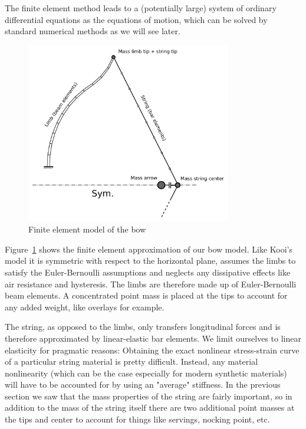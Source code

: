 The finite element method leads to a (potentially large) system of ordinary differential equations as the equations of motion, which can be solved by standard numerical methods as we will see later.

\begin{figure}[h]
\centering
\includegraphics[width=0.8\textwidth]{figures/model/bow-simulator}
\caption{Finite element model of the bow}
\label{fig:model:bow-simulator}
\end{figure}

Figure~\ref{fig:model:bow-simulator} shows the finite element approximation of our bow model. Like Kooi's model it is symmetric with respect to the horizontal plane, assumes the limbs to satisfy the Euler-Bernoulli assumptions and neglects any dissipative effects like air resistance and hysteresis. The limbs are therefore made up of Euler-Bernoulli beam elements. A concentrated point mass is placed at the tips to account for any added weight, like overlays for example.

The string, as opposed to the limbs, only transfers longitudinal forces and is therefore approximated by linear-elastic bar elements. We limit ourselves to linear elasticity for pragmatic reasons: Obtaining the exact nonlinear stress-strain curve of a particular string material is pretty difficult. Instead, any material nonlinearity (which can be the case especially for modern synthetic materials) will have to be accounted for by using an "average" stiffness. In the previous section we saw that the mass properties of the string are fairly important, so in addition to the mass of the string itself there are two additional point masses at the tips and center to account for things like servings, nocking point, etc.

